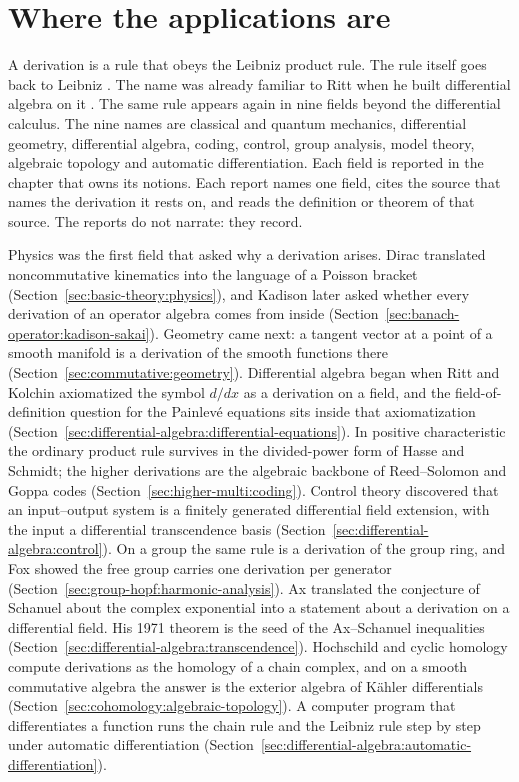\section*{Where the applications are}

A derivation is a rule that obeys the Leibniz product rule. The rule itself
goes back to Leibniz \cite{Leibniz1684}. The name was already familiar to
Ritt when he built differential algebra on it \cite[p.~1]{Ritt1950}. The same
rule appears again in nine fields beyond the differential calculus. The nine
names are classical and quantum mechanics, differential geometry,
differential algebra, coding, control, group analysis, model theory,
algebraic topology and automatic differentiation. Each field is reported in
the chapter that owns its notions.
Each report names one field, cites the source that names the derivation it
rests on, and reads the definition or theorem of that source. The reports do
not narrate: they record.

Physics was the first field that asked why a derivation arises. Dirac
\cite{Dirac1925} translated noncommutative kinematics into the language of a
Poisson bracket
(Section~\ref{sec:basic-theory:physics}), and Kadison \cite{Kadison1966} later
asked whether every derivation of an operator algebra comes from inside
(Section~\ref{sec:banach-operator:kadison-sakai}). Geometry came next: a tangent vector
at a point of a smooth manifold is a derivation of the smooth functions there
(Section~\ref{sec:commutative:geometry}). Differential algebra began when Ritt
and Kolchin axiomatized the symbol $d/dx$ as a derivation on a field, and the
field-of-definition question for the Painlev\'e equations sits inside that
axiomatization (Section~\ref{sec:differential-algebra:differential-equations}). In
positive characteristic the ordinary product rule survives in the
divided-power form of Hasse and Schmidt; the higher derivations are the
algebraic backbone of Reed--Solomon and Goppa codes
(Section~\ref{sec:higher-multi:coding}). Control theory discovered that an
input--output system is a finitely generated differential field extension,
with the input a differential transcendence basis
(Section~\ref{sec:differential-algebra:control}). On a group the same rule is a
derivation of the group ring, and Fox showed the free group carries one
derivation per generator (Section~\ref{sec:group-hopf:harmonic-analysis}).
Ax translated the conjecture of Schanuel about the complex exponential into a
statement about a derivation on a differential field. His 1971 theorem is the
seed of the Ax--Schanuel inequalities
(Section~\ref{sec:differential-algebra:transcendence}). Hochschild and cyclic
homology compute derivations as the homology of a chain complex, and on a
smooth commutative algebra the answer is the exterior algebra of K\"ahler
differentials (Section~\ref{sec:cohomology:algebraic-topology}). A computer
program that differentiates a function runs the chain rule and the Leibniz
rule step by step under automatic differentiation
(Section~\ref{sec:differential-algebra:automatic-differentiation}).

